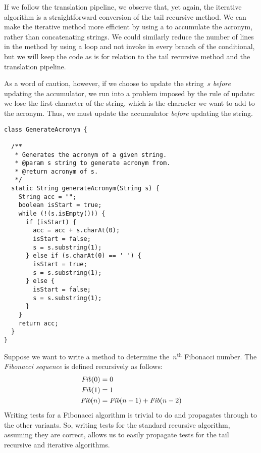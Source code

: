 If we follow the translation pipeline, we observe that, yet again, the iterative algorithm is a straightforward conversion of the tail recursive method. 
We can make the iterative method more efficient by using a  to accumulate the acronym, rather than concatenating strings.
We could similarly reduce the number of lines in the method by using a  loop and not invoke  in every branch of the conditional, but we will keep the code as is for relation to the tail recursive method and the translation pipeline.

As a word of caution, however, if we choose to update the string~$s$ \emph{before} updating the accumulator, we run into a problem imposed by the rule of update: we lose the first character of the string, which is the character we want to add to the acronym. 
Thus, we must update the accumulator \emph{before} updating the string.

\newpage %
\begin{lstlisting}[language=MyJava]
class GenerateAcronym {

  /**
   * Generates the acronym of a given string.
   * @param s string to generate acronym from.
   * @return acronym of s.
   */
  static String generateAcronym(String s) {
    String acc = "";
    boolean isStart = true;
    while (!(s.isEmpty())) {
      if (isStart) { 
        acc = acc + s.charAt(0);
        isStart = false; 
        s = s.substring(1);
      } else if (s.charAt(0) == ' ') { 
        isStart = true; 
        s = s.substring(1);
      } else {
        isStart = false;
        s = s.substring(1);
      }
    }
    return acc;
  }
}
\end{lstlisting}

Suppose we want to write a method to determine the~$n^\text{th}$ Fibonacci number. 
The \emph{Fibonacci sequence} is defined recursively as follows:
\begin{align*}
  \emph{Fib}(0) &= 0\\
  \emph{Fib}(1) &= 1\\
  \emph{Fib}(n) &= \emph{Fib}(n - 1) + \emph{Fib}(n - 2)
\end{align*}
Writing tests for a Fibonacci algorithm is trivial to do and propagates through to the other variants. 
So, writing tests for the standard recursive algorithm, assuming they are correct, allows us to easily propagate tests for the tail recursive and iterative algorithms.

